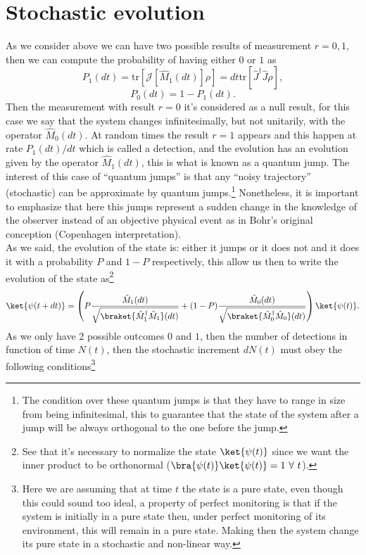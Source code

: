 \section{Stochastic evolution}
As we consider above we can have two possible results of measurement $r=0,1$, then we can  compute the probability of having either $0$ or $1$ as
\[P_{1}(dt)=\text{tr}[\mathcal{J}[\hat{M}_1(dt)]\rho]=dt\text{tr}[\hat{J}^{\dagger}\hat{J}\rho],\]
\[P_{0}(dt)=1-P_1(dt).\]
Then the measurement with result $r=0$ it's considered as a null result, for this case we say that the system changes infinitesimally, but not unitarily, with the operator $\hat{M}_0(dt)$. At random times the result $r=1$ appears and this happen at rate $P_{1}(dt)/dt$ which is called a detection, and the evolution has an evolution given by the operator $\hat{M}_1(dt)$, this is what is known as a quantum jump. The interest of this case of ``quantum jumps'' is that any ``noisy trajectory'' (stochastic) can be approximate by quantum jumps.\footnote{The condition over these quantum jumps is that they have to range in size from being infinitesimal, this to guarantee that the state of the system after a jump will be always orthogonal to the one before the jump\cite{PhysRevLett.74.4827, Wiseman2002, 0305-4470-30-21-026, articlediosi}.} Nonetheless, it is important to emphasize that here this jumps represent a sudden change in the knowledge of the observer instead of an objective physical event as in Bohr's  original conception (Copenhagen interpretation)\cite{Bohr1913-BOHOTC}.\\
As we said, the evolution of the state is: either it jumps or it does not and it does it with a probability $P$ and $1-P$ respectively, this allow us then to write the evolution of the state as\footnote{See that it's necessary to normalize the state $\ket{\psi(t)}$ since we want the inner product to be orthonormal ($\bra{\psi(t)}\ket{\psi(t)}=1 \ \forall \ t$).}
\begin{equation}
\ket{\psi(t+dt)}=\left(
P\frac{\hat{M}_{1}(dt)}{\sqrt{\braket{\hat{M}_{1}^{\dagger}\hat{M}_{1}}(dt)}}+(1-P) \frac{\hat{M}_0(dt)}{\sqrt{\braket{\hat{M}_{0}^{\dagger}\hat{M}_{0}}(dt)}}\right)\ket{\psi(t)}.
\label{trajectory4}
\end{equation}
As we only have 2 possible outcomes $0$ and $1$, then the number of detections in function of time $N(t)$, then the stochastic increment $dN(t)$ must obey the following conditions\footnote{Here we are assuming that at time $t$ the state is a pure state, even though this could sound too ideal, a property of perfect monitoring is that if the system is initially in a pure state then, under perfect monitoring of its environment, this will remain in a pure state. Making then the system change its pure state in a stochastic and non-linear way.}
